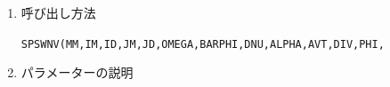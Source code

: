 \documentclass[a4j,fleqn]{jarticle}
\begin{document}
\begin{enumerate}
さて, $\Phi=\bar\Phi+\Phi'$と$\Phi$を平均部分と擾乱部分に分離すると,
上記の方程式系は以下のように書きかえられる:
\begin{equation}
\dot{q}=-\frac{\partial A}{\cos\varphi\partial\lambda}
-\frac{\partial(B\cos\varphi)}{\cos\varphi\partial\varphi}
+\frac{\nu}{\bar\Phi}\{2(\nabla^2+1)\zeta_{\Phi'}-\nabla^2(\Phi'\zeta)\}
+\nu(\nabla^2+2)\zeta,
\end{equation}
\begin{eqnarray}
\dot{D}=\frac{\partial B}{\cos\varphi\partial\lambda}
-\frac{\partial(A\cos\varphi)}{\cos\varphi\partial\varphi}
-\nabla^2(E+\frac{\nu}{\bar\Phi}\alpha\Phi' D)
+\frac{\nu}{\bar\Phi}\{2(\nabla^2+1)D_{\Phi'}\}\nonumber\\
-\nabla^2\Phi'+\nu\left\{(2-\alpha)\nabla^2+2\right\}D,
\end{eqnarray}
\begin{equation}
\dot{\Phi'}=-D_{\Phi'}-\bar\Phi D.
\end{equation}
本サブルーチンは, 上記の$q,D,\Phi$のスペクトル展開係数
$q^m_n,D^m_n,\Phi^m_n$および$\bar\Phi,\nu,\alpha$を入力として,
$\dot{q},\dot{D},\dot{\Phi}$の非線形部分:
\begin{equation}
\dot{q}_{非線形}=-\frac{\partial A}{\cos\varphi\partial\lambda}
-\frac{\partial(B\cos\varphi)}{\cos\varphi\partial\varphi}
+\frac{\nu}{\bar\Phi}\{2(\nabla^2+1)\zeta_{\Phi'}-\nabla^2(\Phi'\zeta)\},
\end{equation}
\begin{eqnarray}
\dot{D}_{非線形}=\frac{\partial B}{\cos\varphi\partial\lambda}
-\frac{\partial(A\cos\varphi)}{\cos\varphi\partial\varphi}
-\nabla^2(E+\frac{\nu}{\bar\Phi}\alpha\Phi' D)
+\frac{\nu}{\bar\Phi}\{2(\nabla^2+1)D_{\Phi'}\}
\end{eqnarray}
\begin{equation}
\dot{\Phi'}_{非線形}=-D_{\Phi'},
\end{equation}
の切断波数$M$までのスペクトル展開係数を求めるものである.

\item 呼び出し方法 

{\tt SPSWNV(MM,IM,ID,JM,JD,OMEGA,BARPHI,DNU,ALPHA,AVT,DIV,PHI,}\\
\hspace*{10em}{\tt DAVT,DDIV,DPHI,RN,IRM,IT,T,Y,IP,P,R,IA,A,Q,WS,WW)}
  
\item パラメーターの説明


\end{enumerate}
\end{document}
